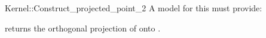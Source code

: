 \begin{ccRefFunctionObjectConcept}{Kernel::Construct_projected_point_2}
A model for this must provide:


       {returns the orthogonal projection of  onto .}

\ccIsModel{}

\end{ccRefFunctionObjectConcept}
